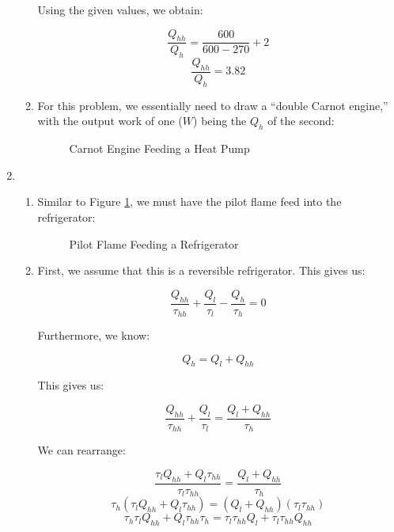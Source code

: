 \begin{enumerate}
\begin{enumerate}
        Using the given values, we obtain:

        $$\frac{Q_{hh}}{Q_h}=\frac{600}{600-270}+2$$
        $$\boxed{\frac{Q_{hh}}{Q_h}=3.82}$$

      \item 

        For this problem, we essentially need to draw a ``double Carnot engine,'' with the output work of one ($W$) being the $Q_h$ of the second:

        \begin{figure}[H]
          \centering
          
          \caption{Carnot Engine Feeding a Heat Pump}
          \label{fig:1}
        \end{figure}

    \end{enumerate}

  \item

    \begin{enumerate}

      \item 

        Similar to Figure \ref{fig:1}, we must have the pilot flame feed into the refrigerator:

        \begin{figure}[H]
          \centering
          
          \caption{Pilot Flame Feeding a Refrigerator}
          \label{fig:2}
        \end{figure}

      \item 

        First, we assume that this is a reversible refrigerator. This gives us:

        $$\frac{Q_{hh}}{\tau_{hh}}+\frac{Q_l}{\tau_l}-\frac{Q_h}{\tau_h}=0$$

        Furthermore, we know:

        $$Q_h=Q_l+Q_{hh}$$

        This gives us:

        $$\frac{Q_{hh}}{\tau_{hh}}+\frac{Q_l}{\tau_l}=\frac{Q_l+Q_{hh}}{\tau_h}$$

        We can rearrange:

        $$\frac{\tau_lQ_{hh}+Q_l\tau_{hh}}{\tau_l\tau_{hh}}=\frac{Q_l+Q_{hh}}{\tau_h}$$
        $$\tau_h(\tau_lQ_{hh}+Q_l\tau_{hh})=(Q_l+Q_{hh})(\tau_l\tau_{hh})$$
        $$\tau_h\tau_lQ_{hh}+Q_l\tau_{hh}\tau_h=\tau_l\tau_{hh}Q_l+\tau_l\tau_{hh}Q_{hh}$$


\end{enumerate}
\end{enumerate}
